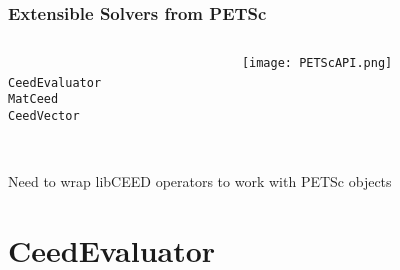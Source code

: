\documentclass{beamer}
\begin{document}

\begin{frame}[fragile]
\begin{center}
\frametitle{Extensible Solvers from PETSc}

\begin{columns}
  \begin{column}{.25\textwidth}
    ~\\
    \lstinline{CeedEvaluator}\\
    \vspace{1.75cm}
    \lstinline{MatCeed}\\
    \vspace{0.75cm}
    \lstinline{CeedVector}\\
  \end{column}
  \begin{column}{.75\textwidth}
    \texttt{[image: PETScAPI.png]}
  \end{column}
\end{columns}

~\\

Need to wrap libCEED operators to work with PETSc objects\\

\end{center}
\end{frame}

\section{CeedEvaluator}
\end{document}
